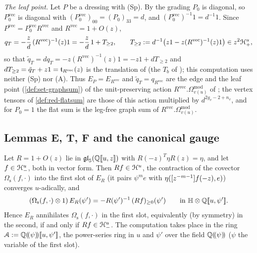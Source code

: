 \emph{The leaf point.} Let $P$ be a dressing with (Sp). By the grading $P_0$ is diagonal, so $P_0^{\mathrm{vec}}$ is diagonal with $(P_0^{\mathrm{vec}})_{00} = (P_0)_{33} = d$, and $(P_0^{\mathrm{vec}})^{-1}1 = d^{-1}1$. Since $P^{\mathrm{vec}} = P_0^{\mathrm{vec}}R^{\mathrm{vec}}$ and $R^{\mathrm{vec}} = 1+O(z)$,
\begin{equation}
\label{eq:tra-leaf}
q_T = -\frac zd\,(R^{\mathrm{vec}})^{-1}(z)1 = -\frac zd\,1+T_{\geq 2},\qquad T_{\geq 2} := d^{-1}\bigl(z1-z(R^{\mathrm{vec}})^{-1}(z)1\bigr)\in z^2\mathcal{H}^u_+ ,
\end{equation}
so that $\tilde q_T = dq_T = -z(R^{\mathrm{vec}})^{-1}(z)1 = -z1+dT_{\geq 2}$ and $dT_{\geq 2} = \tilde q_T+z1 = \mathfrak{t}_{R^{\mathrm{vec}}}(z)$ is the translation of \cite[Def.~2.13]{PPZ15} (the $T_b$ of \cite[Prop.~2.12]{PPZ15}); this computation uses neither (Sp) nor (A). Thus $E_P = E_{R^{\mathrm{vec}}}$ and $\tilde q_T = q_{R^{\mathrm{vec}}}$ are the edge and the leaf point (\cref{def:set-graphsum}) of the unit-preserving action $R^{\mathrm{vec}}.\Omega^{\mathrm{mod}}_{v(u)}$ of \cite[Defs.~2.2, 2.13]{PPZ15}; the vertex tensors of \cref{def:red-flatsum} are those of this action multiplied by $d^{2g_v-2+n_v}$, and for $P_0 = 1$ the flat sum is the leg-free graph sum of $R^{\mathrm{vec}}.\Omega^{\mathrm{mod}}_{v(u)}$.

\subsection{Lemmas E, T, F and the canonical gauge}
\label{sec:tra-lemmas}

\begin{lem}[Lemma E]
\label{lem:tra-E}
Let $R = 1+O(z)$ lie in $\mathfrak{gl}_5(\mathbb{Q}[\![ u,z ]\!])$ with $R(-z)^T\eta R(z) = \eta$, and let $f\in\mathcal{H}^u_-$, both in vector form. Then $Rf\in\mathcal{H}^u$, the contraction of the covector $\Omega_{\mathrm s}(f,\cdot)$ into the first slot of $E_R$ (it pairs $\psi^me$ with $\eta([z^{-m-1}]f(-z),e)$) converges $u$-adically, and
\begin{equation}
\label{eq:tra-lemE}
(\Omega_{\mathrm s}(f,\cdot)\otimes 1)\,E_R(\psi') = -R(\psi')^{-1}\,(Rf)_{\geq 0}(\psi')\qquad\text{in }\mathbb{H}\otimes\mathbb{Q}[\![ u,\psi' ]\!] .
\end{equation}
Hence $E_R$ annihilates $\Omega_{\mathrm s}(f,\cdot)$ in the first slot, equivalently (by symmetry) in the second, if and only if $Rf\in\mathcal{H}^u_-$. The computation takes place in the ring $\mathcal{A} := \mathbb{Q}(\!(\psi)\!)[\![ u,\psi' ]\!]$, the power-series ring in $u$ and $\psi'$ over the field $\mathbb{Q}(\!(\psi)\!)$ ($\psi$ the variable of the first slot).
\end{lem}

